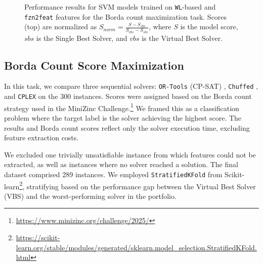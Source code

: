 \begin{figure}[t]
      \caption{Performance results for SVM models trained on \texttt{WL}-based and \texttt{fzn2feat} features for the Borda count maximization task. Scores (top) are normalized as $S_{norm} = \frac{S - S_{sbs}}{S_{vbs} - S_{sbs}}$, where $S$ is the model score, $sbs$ is the Single Best Solver, and $vbs$ is the Virtual Best Solver. 
      }
      \label{fig:svc-wlc-fzn2feat-scores}
    \end{figure}

    \subsection{Borda Count Score Maximization}\label{sec:borda-cout}
    In this task, we compare three sequential solvers: \texttt{OR-Tools} (CP-SAT) \citep{ortools-cpsat}, \texttt{Chuffed} \citep{chuffed}, and \texttt{CPLEX} \citep{Nickel2022-eb} on the 300 instances. Scores were assigned based on the Borda count strategy used in the MiniZinc Challenge.\footnote{\url{https://www.minizinc.org/challenge/2025/}} We framed this as a classification problem where the target label is the solver achieving the highest score. The results and Borda count scores reflect only the solver execution time, excluding feature extraction costs.

    We excluded one trivially unsatisfiable instance from which features could not be extracted, as well as instances where no solver reached a solution. The final dataset comprised 289 instances. We employed \texttt{StratifiedKFold} from Scikit-learn\footnote{\url{https://scikit-learn.org/stable/modules/generated/sklearn.model\_selection.StratifiedKFold.html}}, stratifying based on the performance gap between the Virtual Best Solver (VBS) and the worst-performing solver in the portfolio.

